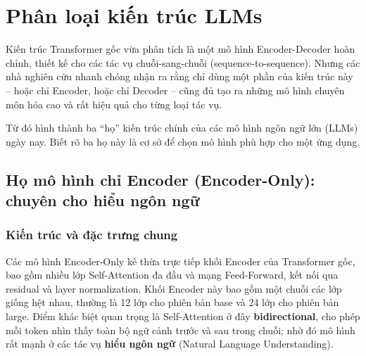 
\section{Phân loại kiến trúc LLMs}
\label{sec:llm_architectures_classification}

Kiến trúc Transformer gốc vừa phân tích là một mô hình Encoder-Decoder hoàn chỉnh, thiết kế cho các tác vụ chuỗi-sang-chuỗi (sequence-to-sequence). Nhưng các nhà nghiên cứu nhanh chóng nhận ra rằng chỉ dùng một phần của kiến trúc này -- hoặc chỉ Encoder, hoặc chỉ Decoder -- cũng đủ tạo ra những mô hình chuyên môn hóa cao và rất hiệu quả cho từng loại tác vụ.

Từ đó hình thành ba “họ” kiến trúc chính của các mô hình ngôn ngữ lớn (LLMs) ngày nay. Biết rõ ba họ này là cơ sở để chọn mô hình phù hợp cho một ứng dụng.

\subsection{Họ mô hình chỉ Encoder (Encoder-Only): chuyên cho hiểu ngôn ngữ}
\subsubsection{Kiến trúc và đặc trưng chung}
Các mô hình Encoder-Only kế thừa trực tiếp khối Encoder của Transformer gốc, bao gồm nhiều lớp Self-Attention đa đầu và mạng Feed-Forward, kết nối qua residual và layer normalization. Khối Encoder này bao gồm một chuỗi các lớp giống hệt nhau, thường là 12 lớp cho phiên bản base và 24 lớp cho phiên bản large. Điểm khác biệt quan trọng là Self-Attention ở đây \textbf{bidirectional}, cho phép mỗi token nhìn thấy toàn bộ ngữ cảnh trước và sau trong chuỗi; nhờ đó mô hình rất mạnh ở các tác vụ \textbf{hiểu ngôn ngữ} (Natural Language Understanding).

